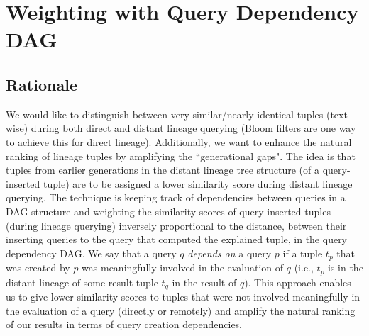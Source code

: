 \section{Weighting with Query Dependency DAG}
\subsection{Rationale} We would like to distinguish between very similar/nearly identical tuples (text-wise) during both direct and distant lineage querying (Bloom filters are one way to achieve this for direct lineage). 
Additionally, we want to enhance the natural ranking of lineage tuples by amplifying the ``generational gaps". The idea is that tuples from earlier generations in the distant lineage tree structure (of a query-inserted tuple) are to be assigned a lower similarity score during distant lineage querying. 
The technique is keeping track of dependencies between queries in a DAG structure and weighting the similarity scores of query-inserted tuples (during lineage querying) inversely proportional to the distance, between their inserting queries to the query that computed the explained tuple, in the query dependency DAG. We say that a query $q$ \textit{depends on} a query $p$ if a tuple $t_p$ that was created by $p$ was meaningfully involved in the evaluation of $q$ (i.e., $t_p$ is in the distant lineage of some result tuple $t_q$ in the result of $q$).
This approach enables us to give lower similarity scores to tuples that were not involved meaningfully in the evaluation of a query (directly or remotely) and amplify the natural ranking of our results in terms of query creation dependencies.\\

